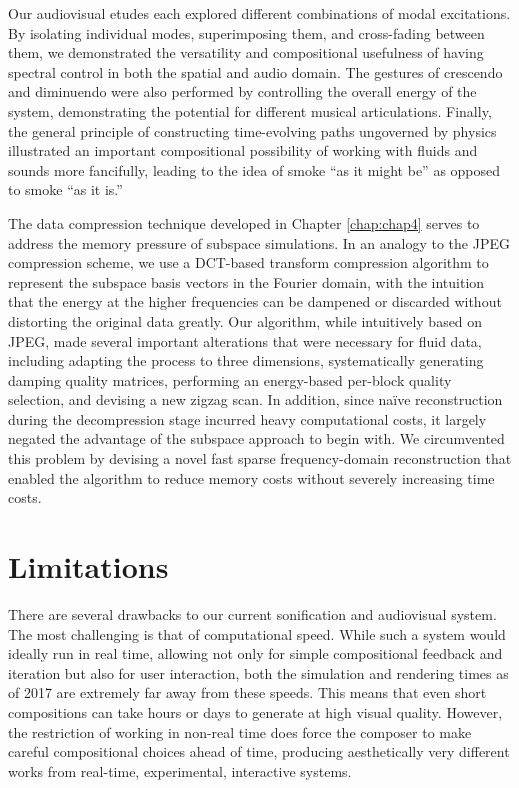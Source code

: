 Our audiovisual etudes each explored different combinations of modal excitations. By isolating individual modes, superimposing them, and cross-fading between them, we demonstrated
the versatility and compositional usefulness of having spectral control in both the spatial and audio domain. The gestures of crescendo and diminuendo were also performed by controlling the
overall energy of the system, demonstrating the potential for different musical articulations. Finally, the general principle of constructing time-evolving paths ungoverned by physics illustrated
an important compositional possibility of working with fluids and sounds more fancifully, leading to the idea of smoke ``as it might be'' as opposed to smoke ``as it is.'' 

The data compression technique developed in Chapter \ref{chap:chap4} serves to address the memory pressure of subspace simulations. In an analogy to the JPEG compression scheme,
we use a DCT-based transform compression algorithm to represent the subspace basis vectors in the Fourier domain, with the intuition that the energy at the higher frequencies can be 
dampened or discarded without distorting the original data greatly. Our algorithm, while intuitively based on JPEG, made several important alterations that were necessary for fluid data, including
adapting the process to three dimensions, systematically generating damping quality matrices, performing an energy-based per-block quality selection, and devising a new zigzag scan. In addition, 
since na\"ive reconstruction during the decompression stage incurred heavy computational costs, it largely negated the advantage of the subspace approach to begin with. We circumvented this
problem by devising a novel fast sparse frequency-domain reconstruction that enabled the algorithm to reduce memory costs without severely increasing time costs.

\section{Limitations}
There are several drawbacks to our current sonification and audiovisual system. The most challenging is that of computational speed. While such a system would ideally run in real time,
allowing not only for simple compositional feedback and iteration but also for user interaction, both the simulation and rendering times as of 2017 are extremely far away from these speeds.
This means that even short compositions can take hours or days to generate at high visual quality. However, the restriction of working in non-real time does force the composer to make careful
compositional choices ahead of time, producing aesthetically very different works from real-time, experimental, interactive systems. 

